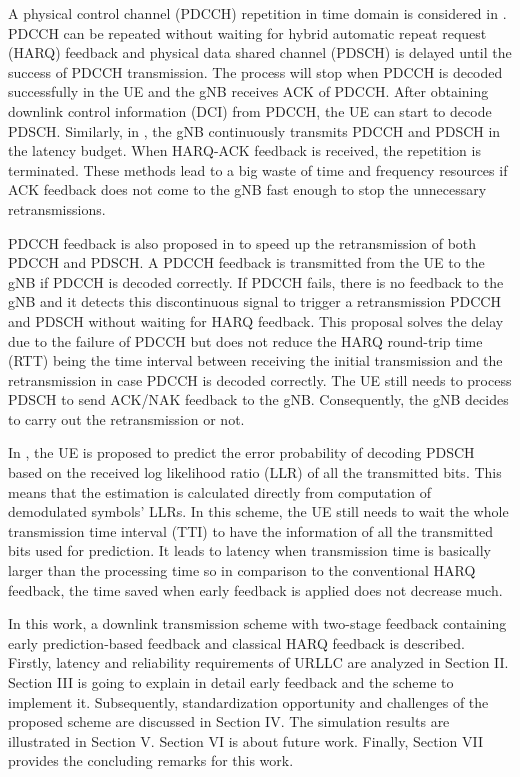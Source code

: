 \documentclass[conference]{IEEEtran}
\begin{document}
A physical control channel (PDCCH) repetition in time domain is considered in \cite{b1}. PDCCH can be repeated without waiting for hybrid automatic repeat request (HARQ) feedback and physical data shared channel (PDSCH) is delayed until the success of PDCCH transmission. The process will stop when PDCCH is decoded successfully in the UE and the gNB receives ACK of PDCCH. After obtaining downlink control information (DCI) from PDCCH, the UE can start to decode PDSCH. Similarly, in \cite{b5}, the gNB continuously transmits PDCCH and PDSCH in the latency budget. When HARQ-ACK feedback is received, the repetition is terminated. These methods lead to a big waste of time and frequency resources if ACK feedback does not come to the gNB fast enough to stop the unnecessary retransmissions. 

PDCCH feedback is also proposed in \cite{b4} to speed up the retransmission of both PDCCH and PDSCH. A PDCCH feedback is transmitted from the UE to the gNB if PDCCH is decoded correctly. If PDCCH fails, there is no feedback to the gNB and it detects this discontinuous signal to trigger a retransmission PDCCH and PDSCH without waiting for HARQ feedback. This proposal solves the delay due to the failure of PDCCH but does not reduce the HARQ round-trip time (RTT) being the time interval between receiving the initial transmission and the retransmission in case PDCCH is decoded correctly. The UE still needs to process PDSCH to send ACK/NAK feedback to the gNB. Consequently, the gNB decides to carry out the retransmission or not.

In \cite{b2}, the UE is proposed to predict the error probability of decoding PDSCH based on the received log likelihood ratio (LLR) of all the transmitted bits. This means that the estimation is calculated directly from computation of demodulated symbols' LLRs. In this scheme, the UE still needs to wait the whole transmission time interval (TTI) to have the information of all the transmitted bits used for prediction. It leads to latency when transmission time is basically larger than the processing time so in comparison to the conventional HARQ feedback, the time saved when early feedback is applied does not decrease much.

In this work, a downlink transmission scheme with two-stage feedback containing early prediction-based feedback and classical HARQ feedback is described. Firstly, latency and reliability requirements of URLLC are analyzed in Section II. Section III is going to explain in detail early feedback and the scheme to implement it. Subsequently, standardization opportunity and challenges of the proposed scheme are discussed in Section IV. The simulation results are illustrated in Section V. Section VI is about future work. Finally, Section VII provides the concluding remarks for this work.
\end{document}
